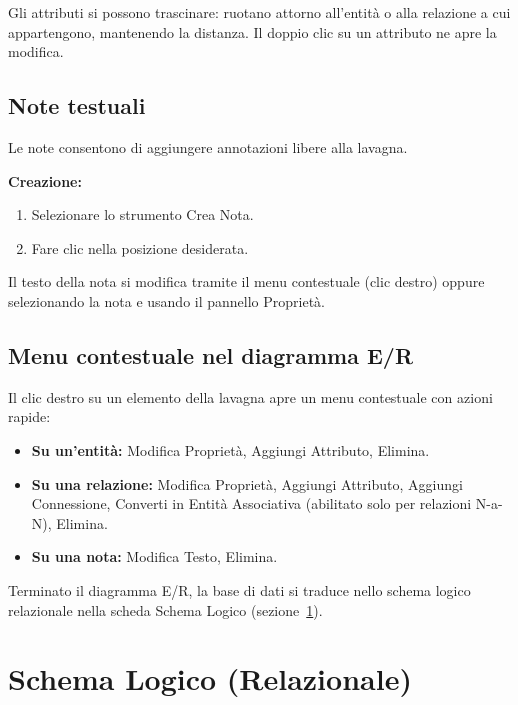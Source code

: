 \documentclass[a4paper,11pt]{article}
\newcommand\mediumweight{\fontseries{mb}\selectfont}
\newcommand\currenticon{book}
\newcommand\tocicon{book}
\newcommand\sectionicon[1]{%
  \renewcommand\currenticon{#1}%
  \addtocontents{toc}{\gdef\protect\tocicon{#1}}}
\newcommand\uielement[1]{{\mediumweight #1}}
\begin{document}
Gli attributi si possono trascinare: ruotano attorno all'entità o alla relazione a cui
appartengono, mantenendo la distanza. Il doppio clic su un attributo ne apre la modifica.

\subsection{Note testuali}

Le note consentono di aggiungere annotazioni libere alla lavagna.

\textbf{Creazione:}
\begin{enumerate}
  \item Selezionare lo strumento \uielement{Crea Nota}.
  \item Fare clic nella posizione desiderata.
\end{enumerate}

Il testo della nota si modifica tramite il menu contestuale (clic destro) oppure
selezionando la nota e usando il pannello Proprietà.

\subsection{Menu contestuale nel diagramma E/R}

Il clic destro su un elemento della lavagna apre un menu contestuale con azioni rapide:

\begin{itemize}
  \item \textbf{Su un'entità:} Modifica Proprietà, Aggiungi Attributo, Elimina.
  \item \textbf{Su una relazione:} Modifica Proprietà, Aggiungi Attributo, Aggiungi Connessione,
        Converti in Entità Associativa (abilitato solo per relazioni N-a-N), Elimina.
  \item \textbf{Su una nota:} Modifica Testo, Elimina.
\end{itemize}

\begin{tcolorbox}[tipbox, title={Il passo successivo}]
  Terminato il diagramma E/R, la base di dati si traduce nello schema logico relazionale nella
  scheda \uielement{Schema Logico} (sezione~\ref{sec:relational}).
\end{tcolorbox}

\sectionicon{relational}
\section{Schema Logico (Relazionale)}
\label{sec:relational}
\end{document}
